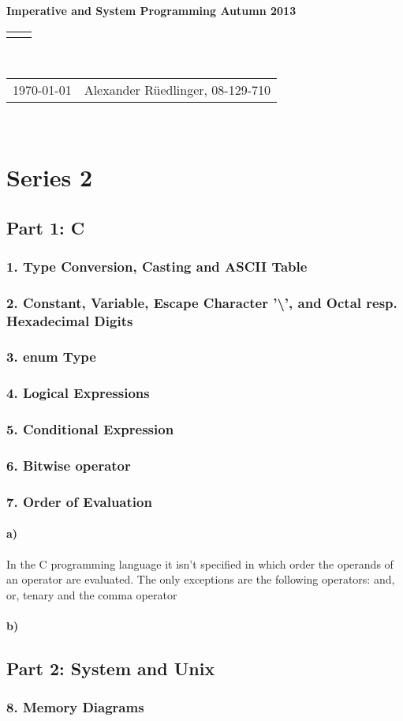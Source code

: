 \documentclass[12pt]{article}
\renewcommand{\title}[1]{\textbf{#1}\\}
\renewcommand{\line}{\begin{tabularx}{\textwidth}{X>{\raggedleft}X}\hline\\\end{tabularx}\\[-0.5cm]}
\newcommand{\leftright}[2]{\begin{tabularx}{\textwidth}{X>{\raggedleft}X}#1%
& #2\\\end{tabularx}\\[-0.5cm]}
\begin{document}
\title{Imperative and System Programming Autumn 2013}
\line
\leftright{\today}{Alexander Rüedlinger, 08-129-710} %
\section*{Series 2}
\subsection*{Part 1: C}
\subsubsection*{1. Type Conversion, Casting and ASCII Table}


\subsubsection*{2. Constant, Variable, Escape Character '\textbackslash', and Octal resp. Hexadecimal Digits}

\subsubsection*{3. enum Type}

\subsubsection*{4. Logical Expressions}

\subsubsection*{5. Conditional Expression}

\subsubsection*{6. Bitwise operator}

\subsubsection*{7. Order of Evaluation}
\paragraph{a)}
In the C programming language it isn't specified in which order the operands of an operator are evaluated. The only exceptions are the following operators: and, or, tenary and the comma operator

\paragraph{b)} 

\subsection*{Part 2: System and Unix}
\subsubsection*{8. Memory Diagrams}
\end{document}
